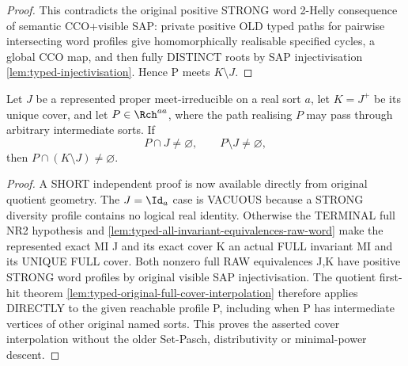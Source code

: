 \begin{proof}
This contradicts the original positive
STRONG word 2-Helly consequence of
semantic CCO+visible SAP: private positive
OLD typed paths for pairwise intersecting
word profiles give homomorphically
realisable specified cycles, a global
CCO map, and then fully DISTINCT roots
by SAP injectivisation
\cref{lem:typed-injectivisation}.
Hence P meets $K\setminus J$.
\end{proof}

\begin{lemma}
\label{lem:typed-cover-interpolation}
Let \(J\) be a represented proper meet-irreducible on a real sort \(a\), let
\(K=J^+\) be its unique cover, and let \(P\in\Rch^{aa}\), where the path
realising \(P\) may pass through arbitrary intermediate sorts.  If
\[
 P\cap J\ne\varnothing,
 \qquad
 P\setminus J\ne\varnothing,
\]
then \(P\cap(K\setminus J)\ne\varnothing\).
\end{lemma}

\begin{proof}
A SHORT independent proof is now available
directly from original quotient geometry.
The $J=\Id_a$ case is VACUOUS because a
STRONG diversity profile contains no
logical real identity. Otherwise the
TERMINAL full NR2 hypothesis and
\cref{lem:typed-all-invariant-equivalences-raw-word}
make the represented exact MI J and
its exact cover K an actual FULL
invariant MI and its UNIQUE FULL cover.
Both nonzero full RAW equivalences J,K
have positive STRONG word profiles by
original visible SAP injectivisation.
The quotient first-hit theorem
\cref{lem:typed-original-full-cover-interpolation}
therefore applies DIRECTLY to the
given reachable profile P, including
when P has intermediate vertices of
other original named sorts. This
proves the asserted cover interpolation
without the older Set-Pasch,
distributivity or minimal-power descent.

\end{proof}

